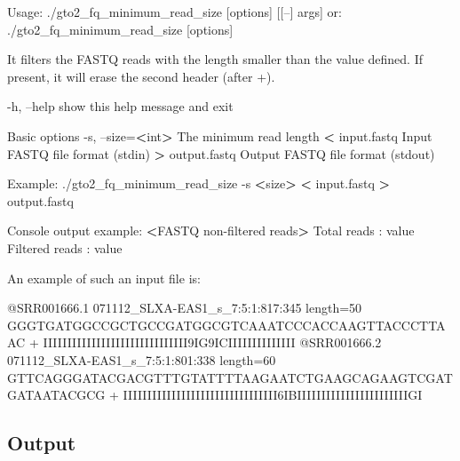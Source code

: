 \documentclass[11pt,]{krantz}
\newenvironment{Shaded}{\begin{snugshade}}{\end{snugshade}}
\newcommand{\OperatorTok}[1]{\textcolor[rgb]{0.43,0.43,0.43}{\textbf{#1}}}
\newcommand{\ExtensionTok}[1]{#1}
\newcommand{\NormalTok}[1]{#1}
\begin{document}
\begin{Shaded}
\begin{Highlighting}[]
\ExtensionTok{Usage}\NormalTok{: ./gto2_fq_minimum_read_size [options] [[--] args]}
   \ExtensionTok{or}\NormalTok{: ./gto2_fq_minimum_read_size [options]}

\ExtensionTok{It}\NormalTok{ filters the FASTQ reads with the length smaller than the }
\ExtensionTok{value}\NormalTok{ defined. }
\ExtensionTok{If}\NormalTok{ present, it will erase the second header (after +)}\ExtensionTok{.}

    \ExtensionTok{-h}\NormalTok{, --help            show this help message and exit}

\ExtensionTok{Basic}\NormalTok{ options}
    \ExtensionTok{-s}\NormalTok{, --size=}\OperatorTok{<}\NormalTok{int}\OperatorTok{>}\NormalTok{      The minimum read length}
    \OperatorTok{<} \ExtensionTok{input.fastq}\NormalTok{         Input FASTQ file format (stdin)}
    \OperatorTok{>} \ExtensionTok{output.fastq}\NormalTok{        Output FASTQ file format (stdout)}

\ExtensionTok{Example}\NormalTok{: ./gto2_fq_minimum_read_size -s }\OperatorTok{<}\NormalTok{size}\OperatorTok{>} \OperatorTok{<}\NormalTok{ input.fastq}
\OperatorTok{>} \ExtensionTok{output.fastq}

\ExtensionTok{Console}\NormalTok{ output example:}
\OperatorTok{<}\ExtensionTok{FASTQ}\NormalTok{ non-filtered reads}\OperatorTok{>}
\ExtensionTok{Total}\NormalTok{ reads    : value}
\ExtensionTok{Filtered}\NormalTok{ reads : value}
\end{Highlighting}
\end{Shaded}

An example of such an input file is:

\begin{Shaded}
\begin{Highlighting}[]
\ExtensionTok{@SRR001666.1}\NormalTok{ 071112_SLXA-EAS1_s_7:5:1:817:345 length=50}
\ExtensionTok{GGGTGATGGCCGCTGCCGATGGCGTCAAATCCCACCAAGTTACCCTTAAC}
\ExtensionTok{+}
\ExtensionTok{IIIIIIIIIIIIIIIIIIIIIIIIIIIIII9IG9ICIIIIIIIIIIIIII}
\ExtensionTok{@SRR001666.2}\NormalTok{ 071112_SLXA-EAS1_s_7:5:1:801:338 length=60}
\ExtensionTok{GTTCAGGGATACGACGTTTGTATTTTAAGAATCTGAAGCAGAAGTCGATGATAATACGCG}
\ExtensionTok{+}
\ExtensionTok{IIIIIIIIIIIIIIIIIIIIIIIIIIIIIIII6IBIIIIIIIIIIIIIIIIIIIIIIIGI}
\end{Highlighting}
\end{Shaded}

\subsection*{Output}\label{output-7}
\end{document}
